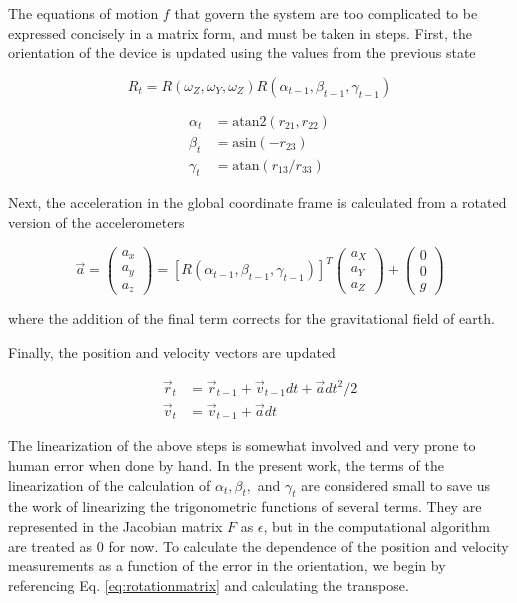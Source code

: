 \documentclass[10pt]{article}
\begin{document}
The equations of motion $f$ that govern the system are too complicated to be expressed concisely in a matrix form, and must be taken in steps. First, the orientation of the device is updated using the values from the previous state

\begin{equation}
R_{t} = R(\omega_Z, \omega_Y, \omega_Z) R(\alpha_{t-1}, \beta_{t-1}, \gamma_{t-1})
\end{equation}

\begin{align}
  \alpha_t &= \mathrm{atan2}(r_{21}, r_{22})\\
  \beta_t &= \mathrm{asin}(-r_{23}) \\ 
  \gamma_t &= \mathrm{atan}(r_{13}/r_{33})
\end{align}

Next, the acceleration in the global coordinate frame is calculated from a rotated version of the accelerometers 

\begin{equation}
  \vec{a} = 
\begin{pmatrix}
a_x \\ a_y \\ a_z 
\end{pmatrix}
=
[R(\alpha_{t-1}, \beta_{t-1}, \gamma_{t-1})]^T 
\begin{pmatrix}
a_X \\ a_Y \\ a_Z
\end{pmatrix}
+
\begin{pmatrix}
  0 \\ 0 \\ g
\end{pmatrix}  
\label{eq:accelerationconversion}
\end{equation}

where the addition of the final term corrects for the gravitational field of earth.

Finally, the position and velocity vectors are updated 

\begin{align}
\vec{r}_t &= \vec{r}_{t-1} + \vec{v}_{t-1} dt + \vec{a} dt^2/2 \\
\vec{v}_t &= \vec{v}_{t-1} + \vec{a} dt
\end{align}

The linearization of the above steps is somewhat involved and very prone to human error when done by hand. In the present work, the terms of the linearization of the calculation of $\alpha_t, \beta_t,$ and $\gamma_t$ are considered small to save us the work of linearizing the trigonometric functions of several terms. They are represented in the Jacobian matrix $F$ as $\epsilon$, but in the computational algorithm are treated as 0 for now.  To calculate the dependence of the position and velocity measurements as a function of the error in the orientation, we begin by referencing Eq. \ref{eq:rotationmatrix} and calculating the transpose.
\end{document}
